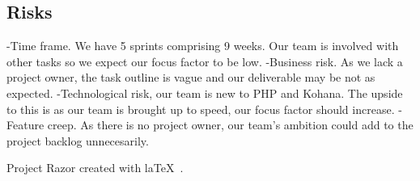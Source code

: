 \documentclass{article}
\begin{document}
\subsection{Risks}
-Time frame. We have 5 sprints comprising 9 weeks. Our team is involved with other tasks so we expect our focus factor to be low.
-Business risk. As we lack a project owner, the task outline is vague and our deliverable may be not as expected.
-Technological risk, our team is new to PHP and Kohana. The upside to this is as our team is brought up to speed, our focus factor should increase.
-Feature creep. As there is no project owner, our team's ambition could add to the project backlog unnecesarily.


Project Razor created with la\TeX~.
\end{document}
